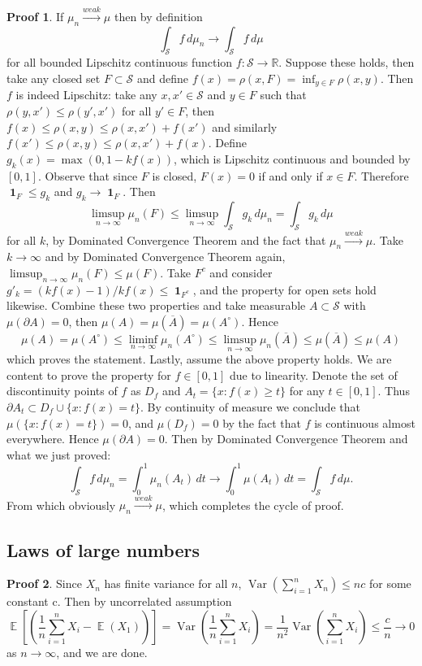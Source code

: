 \documentclass[hidelinks,11pt]{article}
\theoremstyle{definition}
\theoremstyle{dotless}
\newtheorem{prop}{Proof}[section]
\theoremstyle{remark}
\DeclareMathOperator{\Var}{Var}
\DeclareMathOperator{\E}{\mathbb{E}}
\DeclareMathOperator{\1}{\mathbf{1}}
\begin{document}
\begin{prop}
If $\mu_n\xrightarrow{weak}\mu$ then by definition
\[\int_\mathcal{S}f\,d\mu_n\to\int_\mathcal{S}f\,d\mu\]
for all bounded Lipschitz continuous function $f:\mathcal{S}\to\mathbb{R}$.\medbreak
Suppose these holds, then take any closed set $F\subset\mathcal{S}$ and define $f(x)=\rho(x,F)=\inf_{y\in F}\rho(x,y)$. Then $f$ is indeed Lipschitz: take any $x,x'\in\mathcal{S}$ and $y\in F$ such that $\rho(y,x')\leq\rho(y',x')$ for all $y'\in F$, then $f(x)\leq\rho(x,y)\leq\rho(x,x')+f(x')$ and similarly $f(x')\leq\rho(x,y)\leq\rho(x,x')+f(x)$. Define $g_k(x)=\max(0,1-kf(x))$, which is Lipschitz continuous and bounded by $[0,1]$. Observe that since $F$ is closed, $F(x)=0$ if and only if $x\in F$. Therefore $\1_F\leq g_k$ and $g_k\to\1_F$. Then
\[\limsup_{n\to\infty}\mu_n(F)\leq\limsup_{n\to\infty}\int_\mathcal{S}g_k\,d\mu_n=\int_\mathcal{S}g_k\,d\mu\]
for all $k$, by Dominated Convergence Theorem and the fact that $\mu_n\xrightarrow{weak}\mu$. Take $k\to\infty$ and by Dominated Convergence Theorem again, $\limsup_{n\to\infty}\mu_n(F)\leq\mu(F)$. Take $F^c$ and consider $g'_k=(kf(x)-1)/kf(x)\leq\1_{F^c}$, and the property for open sets hold likewise.\medbreak
Combine these two properties and take measurable $A\subset\mathcal{S}$ with $\mu(\partial A)=0$, then $\mu(A)=\mu(\overline{A})=\mu(A^\circ)$. Hence
\[\mu(A)=\mu(A^\circ)\leq\liminf_{n\to\infty}\mu_n(A^\circ)\leq\limsup_{n\to\infty}\mu_n(\overline{A})\leq\mu(\overline{A})\leq\mu(A)\]
which proves the statement.\medbreak
Lastly, assume the above property holds. We are content to prove the property for $f\in[0,1]$ due to linearity. Denote the set of discontinuity points of $f$ as $D_f$ and $A_t=\{x:f(x)\geq t\}$ for any $t\in[0,1]$. Thus $\partial A_t\subset D_f\cup\{x:f(x)=t\}$. By continuity of measure we conclude that $\mu(\{x:f(x)=t\})=0$, and $\mu(D_f)=0$ by the fact that $f$ is continuous almost everywhere. Hence $\mu(\partial A)=0$. Then by Dominated Convergence Theorem and what we just proved:
\[\int_\mathcal{S}f\,d\mu_n=\int_0^1\mu_n(A_t)\,dt\to\int_0^1\mu(A_t)\,dt=\int_\mathcal{S}f\,d\mu.\]
From which obviously $\mu_n\xrightarrow{weak}\mu$, which completes the cycle of proof.
\end{prop}

\subsection{Laws of large numbers}

\begin{prop}
Since $X_n$ has finite variance for all $n$, $\Var(\sum_{i=1}^nX_n)\leq nc$ for some constant c. Then by uncorrelated assumption
\[\E\left[\left(\frac{1}{n}\sum_{i=1}^nX_i-\E(X_1)\right)\right]=\Var\left(\frac{1}{n}\sum_{i=1}^nX_i\right)=\frac{1}{n^2}\Var\left(\sum_{i=1}^nX_i\right)\leq\frac{c}{n}\to0\]
as $n\to\infty$, and we are done.
\end{prop}
\end{document}
